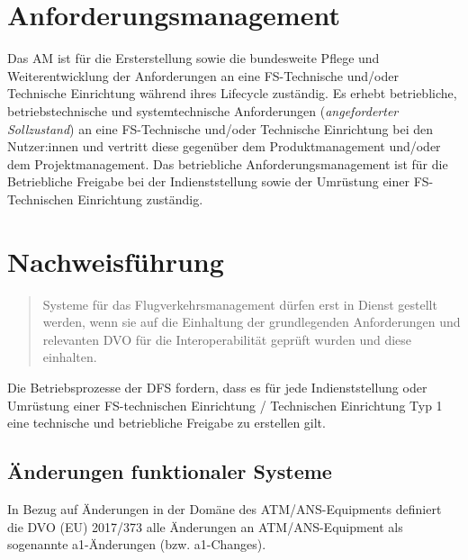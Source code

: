     \section{Anforderungsmanagement}

Das \acf{AM} ist für die Ersterstellung sowie die bundesweite Pflege und Weiterentwicklung der Anforderungen an eine FS-Technische und/oder Technische Einrichtung während ihres Lifecycle zuständig. 
Es erhebt betriebliche, betriebstechnische und systemtechnische Anforderungen (\textit{angeforderter Sollzustand}) an eine FS-Technische und/oder Technische Einrichtung bei den Nutzer:innen und vertritt diese gegenüber dem Produktmanagement und/oder dem Projektmanagement. 
Das betriebliche Anforderungsmanagement ist für die Betriebliche Freigabe bei der Indienststellung sowie der Umrüstung einer FS-Technischen Einrichtung zuständig. \cite[31]{ba_technik}


    \section{Nachweisführung}

\begin{quote}
    Systeme für das Flugverkehrsmanagement dürfen erst in Dienst gestellt werden, wenn sie auf die
Einhaltung der grundlegenden Anforderungen und relevanten DVO für die Interoperabilität
geprüft wurden und diese einhalten. \cite[17]{baf_iop}
\end{quote}


Die Betriebsprozesse der \ac{DFS} fordern, dass es für jede Indienststellung oder Umrüstung einer FS-technischen Einrichtung / Technischen Einrichtung Typ 1 eine technische und betriebliche Freigabe zu erstellen gilt. \cite{fa_freigaben}

\subsection{Änderungen funktionaler Systeme}


In Bezug auf Änderungen in der Domäne des ATM/ANS-Equipments definiert die DVO (EU) 2017/373 alle Änderungen an ATM/ANS-Equipment als sogenannte a1-Änderungen (bzw. a1-Changes).




